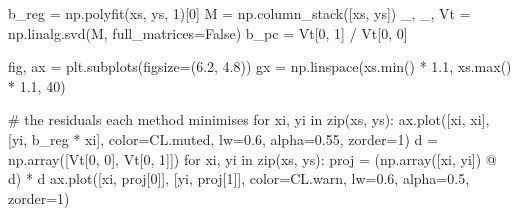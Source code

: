 \documentclass[
  letterpaper,
  10pt,
  twoside,
  openright,
  numbers=noenddot,
  chapterprefix=true]{scrbook}
\newenvironment{Shaded}{}{}
\newcommand{\BuiltInTok}[1]{\textcolor[rgb]{0.84,0.23,0.29}{#1}}
\newcommand{\CommentTok}[1]{\textcolor[rgb]{0.42,0.45,0.49}{#1}}
\newcommand{\ControlFlowTok}[1]{\textcolor[rgb]{0.84,0.23,0.29}{#1}}
\newcommand{\DecValTok}[1]{\textcolor[rgb]{0.00,0.36,0.77}{#1}}
\newcommand{\FloatTok}[1]{\textcolor[rgb]{0.00,0.36,0.77}{#1}}
\newcommand{\KeywordTok}[1]{\textcolor[rgb]{0.84,0.23,0.29}{#1}}
\newcommand{\NormalTok}[1]{\textcolor[rgb]{0.14,0.16,0.18}{#1}}
\newcommand{\OperatorTok}[1]{\textcolor[rgb]{0.14,0.16,0.18}{#1}}
\newcommand{\VariableTok}[1]{\textcolor[rgb]{0.89,0.38,0.04}{#1}}
\newenvironment{qmibarchive}
  {\par\medskip\noindent{\color{econgold}\rule{\linewidth}{1.4pt}}%
   \par\nobreak\vspace{4pt}\noindent\ignorespaces}
  {\par\vspace{2pt}\noindent{\color{econrule}\rule{\linewidth}{0.4pt}}\par\medskip}
\begin{document}
\begin{qmibarchive}
\begin{Shaded}
\begin{Highlighting}[]
\NormalTok{b\_reg }\OperatorTok{=}\NormalTok{ np.polyfit(xs, ys, }\DecValTok{1}\NormalTok{)[}\DecValTok{0}\NormalTok{]}
\NormalTok{M }\OperatorTok{=}\NormalTok{ np.column\_stack([xs, ys])}
\NormalTok{\_, \_, Vt }\OperatorTok{=}\NormalTok{ np.linalg.svd(M, full\_matrices}\OperatorTok{=}\VariableTok{False}\NormalTok{)}
\NormalTok{b\_pc }\OperatorTok{=}\NormalTok{ Vt[}\DecValTok{0}\NormalTok{, }\DecValTok{1}\NormalTok{] }\OperatorTok{/}\NormalTok{ Vt[}\DecValTok{0}\NormalTok{, }\DecValTok{0}\NormalTok{]}

\NormalTok{fig, ax }\OperatorTok{=}\NormalTok{ plt.subplots(figsize}\OperatorTok{=}\NormalTok{(}\FloatTok{6.2}\NormalTok{, }\FloatTok{4.8}\NormalTok{))}
\NormalTok{gx }\OperatorTok{=}\NormalTok{ np.linspace(xs.}\BuiltInTok{min}\NormalTok{() }\OperatorTok{*} \FloatTok{1.1}\NormalTok{, xs.}\BuiltInTok{max}\NormalTok{() }\OperatorTok{*} \FloatTok{1.1}\NormalTok{, }\DecValTok{40}\NormalTok{)}

\CommentTok{\# the residuals each method minimises}
\ControlFlowTok{for}\NormalTok{ xi, yi }\KeywordTok{in} \BuiltInTok{zip}\NormalTok{(xs, ys):}
\NormalTok{    ax.plot([xi, xi], [yi, b\_reg }\OperatorTok{*}\NormalTok{ xi], color}\OperatorTok{=}\NormalTok{CL.muted, lw}\OperatorTok{=}\FloatTok{0.6}\NormalTok{, alpha}\OperatorTok{=}\FloatTok{0.55}\NormalTok{, zorder}\OperatorTok{=}\DecValTok{1}\NormalTok{)}
\NormalTok{d }\OperatorTok{=}\NormalTok{ np.array([Vt[}\DecValTok{0}\NormalTok{, }\DecValTok{0}\NormalTok{], Vt[}\DecValTok{0}\NormalTok{, }\DecValTok{1}\NormalTok{]])}
\ControlFlowTok{for}\NormalTok{ xi, yi }\KeywordTok{in} \BuiltInTok{zip}\NormalTok{(xs, ys):}
\NormalTok{    proj }\OperatorTok{=}\NormalTok{ (np.array([xi, yi]) }\OperatorTok{@}\NormalTok{ d) }\OperatorTok{*}\NormalTok{ d}
\NormalTok{    ax.plot([xi, proj[}\DecValTok{0}\NormalTok{]], [yi, proj[}\DecValTok{1}\NormalTok{]], color}\OperatorTok{=}\NormalTok{CL.warn, lw}\OperatorTok{=}\FloatTok{0.6}\NormalTok{, alpha}\OperatorTok{=}\FloatTok{0.5}\NormalTok{, zorder}\OperatorTok{=}\DecValTok{1}\NormalTok{)}


\end{Highlighting}
\end{Shaded}
\end{qmibarchive}
\end{document}
